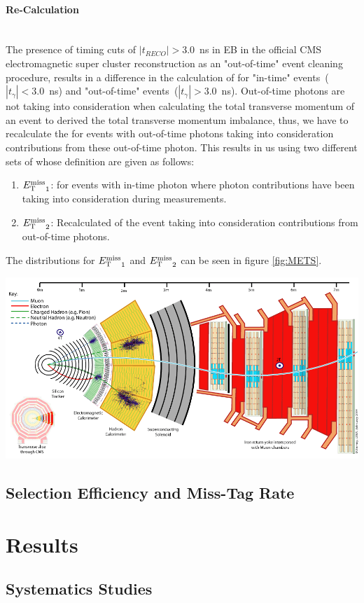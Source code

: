 \paragraph*{\MET Re-Calculation}\mbox{}\\
The presence of timing cuts of $|t_{RECO}| > 3.0$~ns in EB in the official CMS electromagnetic super cluster reconstruction as an "out-of-time" event cleaning procedure, results in a difference in the calculation of \MET for "in-time" events~($|t_{\gamma}| < 3.0$~ns) and "out-of-time" events~($|t_{\gamma}| > 3.0$~ns). Out-of-time photons are not taking into consideration when calculating the total transverse momentum of an event to derived the total transverse momentum imbalance, thus, we have to recalculate the \MET for events with out-of-time photons taking into consideration \pt contributions from these out-of-time photon. This results in us using two different sets of \MET whose   definition are given as follows:
\begin{enumerate}
\item ${E_{\mathrm{T}}^{\text{miss}}}_{1}$: \MET for events with in-time photon where photon \pt contributions have been taking into consideration during \MET measurements.
\item ${E_{\mathrm{T}}^{\text{miss}}}_{2}$: Recalculated \MET of the event taking into consideration \pt contributions from out-of-time photons.
\end{enumerate}
  
The distributions for ${E_{\mathrm{T}}^{\text{miss}}}_{1}$ and ${E_{\mathrm{T}}^{\text{miss}}}_{2}$ can be seen in figure \ref{fig:METS}.

\begin{center}
\centering
\includegraphics[scale=0.4]{THESISPLOTS/CMS_Slice.png}
\label{fig:METS}
\end{center}





\subsection{Selection Efficiency and Miss-Tag Rate}




\section{Results}

\subsection{Systematics Studies}


\label{Search_Analysis_chapter}